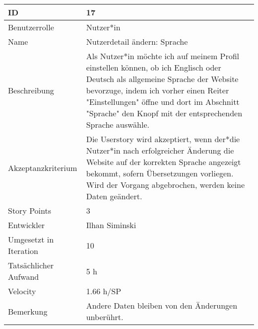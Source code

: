 \begin{tabularx}{\textwidth}{|p{}|X|}
	\hline
	ID & 17\\
	\hline
	Benutzerrolle & Nutzer*in\\
	\hline
	Name & Nutzerdetail ändern: Sprache \\
	\hline
	Beschreibung & Als Nutzer*in möchte ich auf meinem Profil einstellen können, ob ich Englisch oder Deutsch als allgemeine Sprache der Website bevorzuge, indem ich vorher einen Reiter "Einstellungen" öffne und dort im Abschnitt "Sprache" den Knopf mit der entsprechenden Sprache auswähle.\\
	\hline
	Akzeptanzkriterium & Die Userstory wird akzeptiert, wenn der*die Nutzer*in nach erfolgreicher Änderung die Website auf der korrekten Sprache angezeigt bekommt, sofern Übersetzungen vorliegen. Wird der Vorgang abgebrochen, werden keine Daten geändert.\\
	\hline
	Story Points & 3\\
	\hline
	Entwickler & Ilhan Siminski\\
	\hline
	Umgesetzt in Iteration & 10\\ 
	\hline
	Tatsächlicher Aufwand & 5 h\\
	\hline
	Velocity & 1.66 h/SP\\
	\hline
	Bemerkung & Andere Daten bleiben von den Änderungen unberührt.\\
	\hline
\end{tabularx}
\vspace{20pt}

